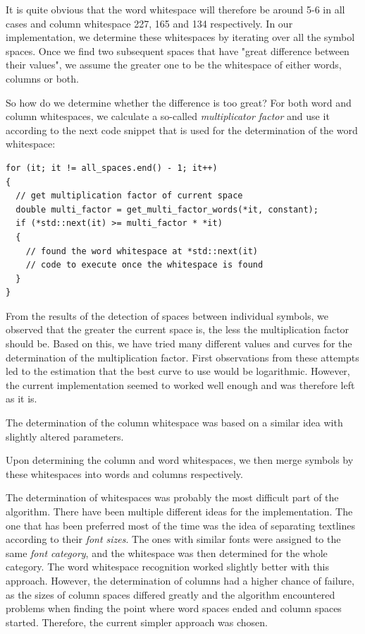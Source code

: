 \begin{enumerate}
It is quite obvious that the word whitespace will therefore be around 5-6 in all cases and column whitespace 227, 165 and 134 respectively. In our implementation, we determine these whitespaces by iterating over all the symbol spaces. Once we find two subsequent spaces that have "great difference between their values", we assume the greater one to be the whitespace of either words, columns or both.

So how do we determine whether the difference is too great? For both word and column whitespaces, we calculate a so-called \emph{multiplicator factor} and use it according to the next code snippet that is used for the determination of the word whitespace:

{\small \begin{verbatim}
for (it; it != all_spaces.end() - 1; it++)
{
  // get multiplication factor of current space
  double multi_factor = get_multi_factor_words(*it, constant);
  if (*std::next(it) >= multi_factor * *it)
  {
    // found the word whitespace at *std::next(it)
    // code to execute once the whitespace is found
  }
}
\end{verbatim}}

From the results of the detection of spaces between individual symbols, we observed that the greater the current space is, the less the multiplication factor should be. Based on this, we have tried many different values and curves for the determination of the multiplication factor. First observations from these attempts led to the estimation that the best curve to use would be logarithmic. However, the current implementation seemed to worked well enough and was therefore left as it is.

The determination of the column whitespace was based on a similar idea with slightly altered parameters.

Upon determining the column and word whitespaces, we then merge symbols by these whitespaces into words and columns respectively.

The determination of whitespaces was probably the most difficult part of the algorithm. There have been multiple different ideas for the implementation. The one that has been preferred most of the time was the idea of separating textlines according to their \emph{font sizes}. The ones with similar fonts were assigned to the same \emph{font category}, and the whitespace was then determined for the whole category. The word whitespace recognition worked slightly better with this approach. However, the determination of columns had a higher chance of failure, as the sizes of column spaces differed greatly and the algorithm encountered problems when finding the point where word spaces ended and column spaces started. Therefore, the current simpler approach was chosen.


\end{enumerate}
